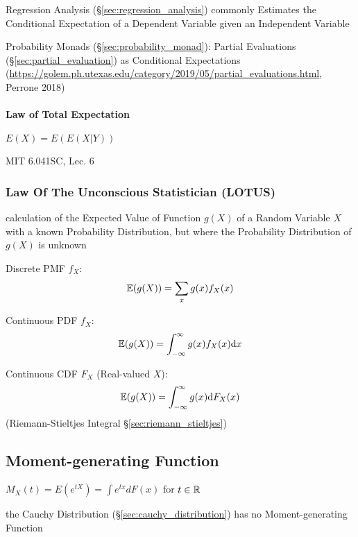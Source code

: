 \fist Regression Analysis (\S\ref{sec:regression_analysis}) commonly Estimates
the Conditional Expectation of a Dependent Variable given an Independent
Variable

\fist Probability Monads (\S\ref{sec:probability_monad}): Partial Evaluations
(\S\ref{sec:partial_evaluation}) as Conditional Expectations
(\url{https://golem.ph.utexas.edu/category/2019/05/partial_evaluations.html},
Perrone 2018)



\paragraph{Law of Total Expectation}\label{sec:total_expectation}\hfill

$E(X) = E(E(X | Y))$

MIT 6.041SC, Lec. 6



\subsubsection{Law Of The Unconscious Statistician (LOTUS)}\label{sec:lotus}

calculation of the Expected Value of Function $g(X)$ of a Random Variable $X$
with a known Probability Distribution, but where the Probability Distribution of
$g(X)$ is unknown

Discrete PMF $f_X$:
\[
  \mathbb{E}(g(X)) = \sum_x g(x) f_X(x)
\]

Continuous PDF $f_X$:
\[
  \mathbb{E}(g(X)) = \int_{-\infty}^\infty g(x) f_X(x) \mathrm{d}x
\]

Continuous CDF $F_X$ (Real-valued $X$):
\[
  \mathbb{E}(g(X)) = \int_{-\infty}^\infty g(x) \mathrm{d}F_X(x)
\]
(Riemann-Stieltjes Integral \S\ref{sec:riemann_stieltjes})



\subsection{Moment-generating Function}\label{sec:moment_generating_function}

$M_X(t) = E(e^{tX}) = \int e^{tx} dF(x)$ for $t \in \mathbb{R}$

the Cauchy Distribution (\S\ref{sec:cauchy_distribution}) has no
Moment-generating Function

